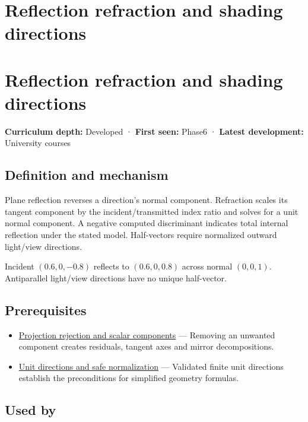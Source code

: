 \hypertarget{appendix-44e00863b4d5}{}
\section*{Reflection refraction and shading directions}
\section{Reflection refraction and shading directions}\label{appendix-44e00863b4d5-reflection-refraction-and-shading-directions}

\textbf{Curriculum depth:} Developed · \textbf{First seen:} Phase6 · \textbf{Latest development:} University courses

\subsection{Definition and mechanism}\label{appendix-44e00863b4d5-definition-and-mechanism}

Plane reflection reverses a direction's normal component. Refraction scales its tangent component by the incident/transmitted index ratio and solves for a unit normal component. A negative computed discriminant indicates total internal reflection under the stated model. Half-vectors require normalized outward light/view directions.

Incident \((0.6,0,-0.8)\) reflects to \((0.6,0,0.8)\) across normal \((0,0,1)\). Antiparallel light/view directions have no unique half-vector.

\subsection{Prerequisites}\label{appendix-44e00863b4d5-prerequisites}

\begin{itemize}
\tightlist
\item
  \hyperref[appendix-505a502c372a]{Projection rejection and scalar components} --- Removing an unwanted component creates residuals, tangent axes and mirror decompositions.
\item
  \hyperref[appendix-f744e41b95b4]{Unit directions and safe normalization} --- Validated finite unit directions establish the preconditions for simplified geometry formulas.
\end{itemize}

\subsection{Used by}\label{appendix-44e00863b4d5-used-by}

